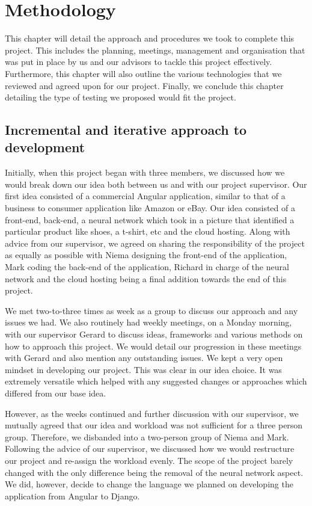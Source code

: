     

\chapter{Methodology}
This chapter will detail the approach and procedures we took to complete this project. This includes the planning, meetings, management and organisation that was put in place by us and our advisors to tackle this project effectively. Furthermore, this chapter will also outline the various technologies that we reviewed and agreed upon for our project. Finally, we conclude this chapter detailing the type of testing we proposed would fit the project.

\section{Incremental and iterative approach to development}
Initially, when this project began with three members, we discussed how we would break down our idea both between us and with our project supervisor. Our first idea consisted of a commercial Angular application, similar to that of a business to consumer application like Amazon or eBay. Our idea consisted of a front-end, back-end, a neural network which took in a picture that identified a particular product like shoes, a t-shirt, etc and the cloud hosting. Along with advice from our supervisor,  we agreed on sharing the responsibility of the project as equally as possible with Niema designing the front-end of the application, Mark coding the back-end of the application, Richard in charge of the neural network and the cloud hosting being a final addition towards the end of this project.

We met two-to-three times as week as a group to discuss our approach and any issues we had. We also routinely had weekly meetings, on a Monday morning, with our supervisor Gerard to discuss ideas, frameworks and various methods on how to approach this project. We would detail our progression in these meetings with Gerard and also mention any outstanding issues.
We kept a very open mindset in developing our project. This was clear in our idea choice. It was extremely versatile which helped with any suggested changes or approaches which differed from our base idea. 

However, as the weeks continued and further discussion with our supervisor, we mutually agreed that our idea and workload was not sufficient for a three person group. Therefore, we disbanded into a two-person group of Niema and Mark. Following the advice of our supervisor, we discussed how we would restructure our project and re-assign the workload evenly. The scope of the project barely changed with the only difference being the removal of the neural network aspect. We did, however, decide to change the language we planned on developing the application from Angular to Django.

